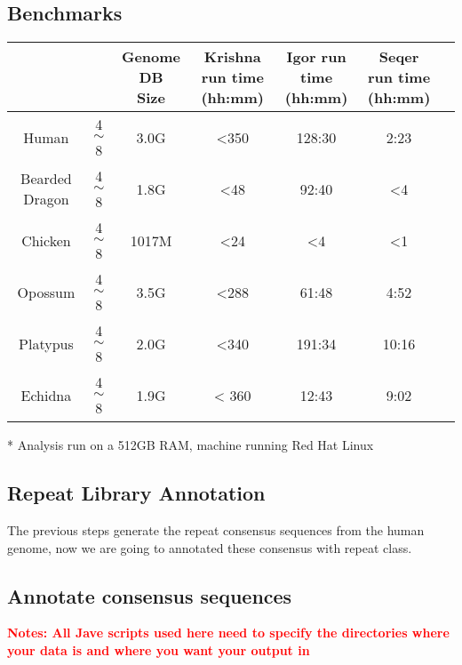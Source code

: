 \documentclass[12pt]{report}
\begin{document}
\subsection*{Benchmarks}

\footnotesize  %
\setlength\tabcolsep{1.5pt}
\begin{center}
	\begin{tabular}{ | c | c | c | c|c|c|c|}
		\hline
		\thead{Genome} & \thead{ Krishna Threads } &  \thead{Genome DB \\ Size} & \thead{Krishna run time \\ (hh:mm)} & \thead{Igor run time \\ (hh:mm)} & \thead{Seqer run time \\ (hh:mm)}  \\
		\hline
		Human & 4$\sim$8  & 3.0G  & {<}350 & 128:30 & 2:23 \\
		\hline 
		Bearded Dragon &  4$\sim$8 & 1.8G &{<}48 &92:40 & {<}4 \\
		\hline
		Chicken & 4$\sim$8 & 1017M &{<}24 & {<}4 & {<}1 \\
		\hline
		Opossum &  4$\sim$8 & 3.5G & {<}288 &61:48 & 4:52 \\
		\hline
		Platypus & 4$\sim$8 & 2.0G & {<}340 & 191:34 & 10:16 \\
		\hline
		Echidna & 4$\sim$8 & 1.9G & {<} 360 & 12:43 & 9:02\\
		\hline
	\end{tabular}
\end{center}

* Analysis run on a 512GB RAM, machine running Red Hat Linux

\subsection*{Repeat Library Annotation}
The previous steps generate the repeat consensus sequences from the human genome, now we are going to annotated these consensus with repeat class.
\subsection*{Annotate consensus sequences}
\textbf{\textcolor{red}{Notes: All Jave scripts used here need to specify the directories where your data is and where you want your output in }}
\end{document}
